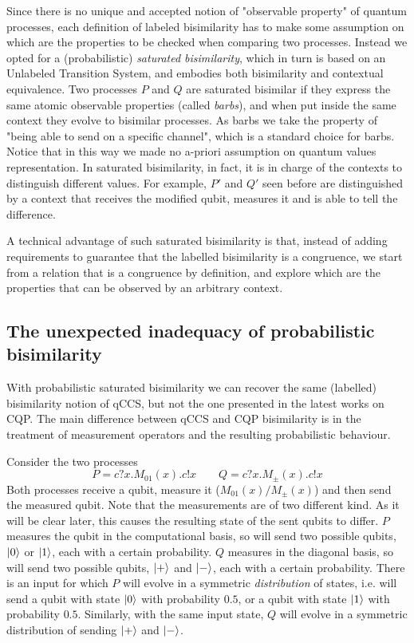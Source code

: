 Since there  is no unique and accepted notion of "observable property" of quantum processes, each definition of labeled bisimilarity has to make some assumption on which are the properties to be checked when comparing two processes. Instead we opted for a (probabilistic) \textit{saturated bisimilarity}, which in turn is based on an Unlabeled Transition System, and embodies both bisimilarity and contextual equivalence. Two processes $P$ and $Q$ are saturated bisimilar if they express the same atomic observable properties (called \textit{barbs}), and when put inside the same context they evolve to bisimilar processes. As barbs we take the property of "being able to send on a specific channel", which  is a standard choice for barbs. Notice that in this way we made no a-priori assumption on quantum values representation. In saturated bisimilarity, in fact, it is in charge of the contexts to distinguish different values. For example, $P'$ and $Q'$ seen before are distinguished by a context that receives the modified qubit, measures it and is able to tell the difference.

A technical advantage of such saturated bisimilarity is that, instead of adding requirements to guarantee that the labelled bisimilarity is a congruence, we start from a relation that is a congruence by definition, and explore which are the properties that can be observed by an arbitrary context.


\subsection*{The unexpected inadequacy of probabilistic bisimilarity}

With probabilistic saturated bisimilarity we can recover the same (labelled) bisimilarity notion of qCCS, but not the one presented in the latest works on CQP. The main difference between qCCS and CQP bisimilarity is in the treatment of measurement operators and the resulting probabilistic behaviour.

Consider the two processes 
\[P = c?x.M_{01}(x).c!x \qquad Q = c?x.M_\pm(x).c!x\]
Both processes receive a qubit, measure it ($M_{01}(x) / M_{\pm}(x)$) and then send the measured qubit. Note that the measurements are of two different kind. As it will be clear later, this causes the resulting state of the sent qubits to differ. $P$ measures the qubit in the computational basis, so will send two possible qubits, $\ket{0}$ or $\ket{1}$, each with a certain probability. $Q$ measures in the diagonal basis, so will send two possible qubits, $\ket{+}$ and $\ket{-}$, each with a certain probability. There is an input for which $P$ will evolve in a symmetric \textit{distribution} of states, i.e. will send a qubit with state $\ket{0}$ with probability $0.5$, or a qubit with state $\ket{1}$ with probability $0.5$. Similarly, with the same input state, $Q$ will evolve in a symmetric distribution of sending $\ket{+}$ and $\ket{-}$.

